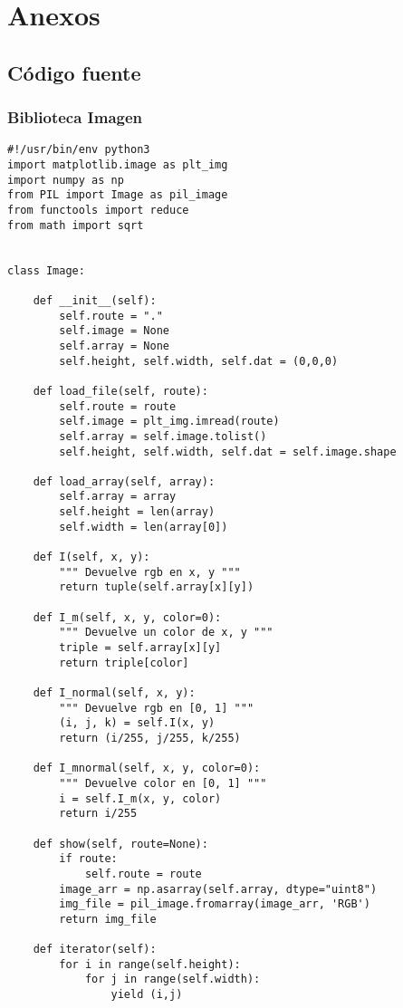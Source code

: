 \documentclass[letter]{article}
\begin{document}
\section{Anexos}
\label{sec:org1146374}
\subsection{Código fuente}
\label{sec:orgbedab53}
\subsubsection{Biblioteca Imagen}
\label{sec:org2222e07}
\begin{verbatim}
#!/usr/bin/env python3
import matplotlib.image as plt_img
import numpy as np
from PIL import Image as pil_image
from functools import reduce
from math import sqrt


class Image:

    def __init__(self):
        self.route = "."
        self.image = None
        self.array = None
        self.height, self.width, self.dat = (0,0,0)

    def load_file(self, route):
        self.route = route
        self.image = plt_img.imread(route)
        self.array = self.image.tolist()
        self.height, self.width, self.dat = self.image.shape

    def load_array(self, array):
        self.array = array
        self.height = len(array)
        self.width = len(array[0])

    def I(self, x, y):
        """ Devuelve rgb en x, y """
        return tuple(self.array[x][y])

    def I_m(self, x, y, color=0):
        """ Devuelve un color de x, y """
        triple = self.array[x][y]
        return triple[color]

    def I_normal(self, x, y):
        """ Devuelve rgb en [0, 1] """
        (i, j, k) = self.I(x, y)
        return (i/255, j/255, k/255)

    def I_mnormal(self, x, y, color=0):
        """ Devuelve color en [0, 1] """
        i = self.I_m(x, y, color)
        return i/255

    def show(self, route=None):
        if route:
            self.route = route
        image_arr = np.asarray(self.array, dtype="uint8")
        img_file = pil_image.fromarray(image_arr, 'RGB')
        return img_file

    def iterator(self):
        for i in range(self.height):
            for j in range(self.width):
                yield (i,j)


\end{verbatim}
\end{document}

